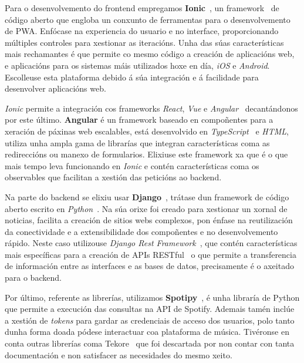 Para o desenvolvemento do \gls{frontend} empregamos \textbf{Ionic}~\cite{ionic5}, un \gls{framework}~\cite{ionicDocs} de código aberto que engloba un conxunto de ferramentas para o desenvolvemento de \acrfull{PWA}. Enfócase na experiencia do usuario e no interface, proporcionando múltiples controles para xestionar as iteracións. Unha das súas características mais rechamantes é que permite co mesmo código a creación de aplicacións web, e aplicacións para os sistemas máis utilizados hoxe en día, \textit{iOS} e \textit{Android}. Escolleuse esta plataforma debido á súa integración e á facilidade para desenvolver aplicacións web.

\textit{Ionic} permite a integración cos frameworks \textit{React}, \textit{Vue} e \textit{Angular}~\cite{angular5} decantándonos por este último. \textbf{Angular} é un \gls{framework} baseado en compoñentes para a xeración de páxinas web escalables, está desenvolvido en \textit{TypeScript}~\cite{typescript} e \textit{\acrshort{HTML}}, utiliza unha ampla gama de librarías que integran características coma as redireccións ou manexo de formularios. Elixiuse este framework xa que é o que mais tempo leva funcionando en \textit{Ionic} e contén características coma os observables que facilitan a xestión das peticións ao backend.

Na parte do \gls{backend} se elixiu usar \textbf{\gls{Django}}~\cite{Django}, trátase dun \gls{framework} de código aberto escrito en \textit{Python}~\cite{python}. Na súa orixe foi creado para xestionar un xornal de noticias, facilita a creación de sitios webs complexos, pon énfase na reutilización da conectividade e a extensibilidade dos compoñentes e no desenvolvemento rápido. Neste caso utilizouse \textit{Django Rest Framework}~\cite{djangoApiGuide}, que contén características mais específicas para a creación de \glspl{API} RESTful~\cite{restapi} o que permite a transferencia de información entre as interfaces e as bases de datos, precisamente é o axeitado para o \gls{backend}.

Por último, referente as librerías, utilizamos \textbf{Spotipy}~\cite{spotipy}, é unha libraría de Python que permite a execución das consultas na \Gls{API} de \Gls{Spotify}. Ademais tamén inclúe a xestión de \textit{tokens} para gardar as credenciais de acceso dos usuarios, polo tanto dunha forma doada pódese interactuar coa plataforma de música. Tivéronse en conta outras librerías coma Tekore~\cite{tekore} que foi descartada por non contar con tanta documentación e non satisfacer as necesidades do mesmo xeito.

